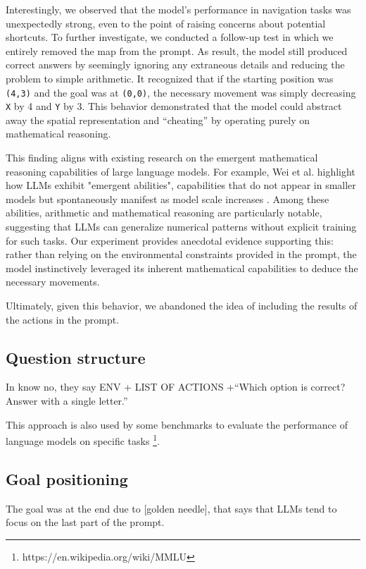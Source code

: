 Interestingly, we observed that the model's performance in navigation tasks was
unexpectedly strong, even to the point of raising concerns about potential shortcuts.
To further investigate, we conducted a follow-up test in which we entirely removed
the map from the prompt. As result, the model still produced correct answers by seemingly
ignoring any extraneous details and reducing the problem to simple arithmetic.
It recognized that if the starting position was \texttt{(4,3)} and the goal was at
\texttt{(0,0)}, the necessary movement was simply decreasing \texttt{X} by 4 and
\texttt{Y} by 3. This behavior demonstrated that the model could abstract away the
spatial representation and ``cheating'' by operating purely on mathematical reasoning.

This finding aligns with existing research on the emergent mathematical reasoning
capabilities of large language models. For example, Wei et al. highlight how
LLMs exhibit "emergent abilities", capabilities that do not appear in smaller models
but spontaneously manifest as model scale increases \cite{wei2022emergentabilitieslargelanguage}.
Among these abilities, arithmetic and mathematical reasoning are particularly notable,
suggesting that LLMs can generalize numerical patterns without explicit training
for such tasks. Our experiment provides anecdotal evidence supporting this:
rather than relying on the environmental constraints provided in the prompt, the
model instinctively leveraged its inherent mathematical capabilities to deduce the
necessary movements.

Ultimately, given this behavior, we abandoned the idea of including the results of
the actions in the prompt.

\subsection{Question structure}

In know no, they say ENV + LIST OF ACTIONS +``Which option is correct? Answer with
a single letter.''

This approach is also used by some benchmarks to evaluate the performance of language
models on specific tasks \footnote{https://en.wikipedia.org/wiki/MMLU}.

\subsection{Goal positioning}

The goal was at the end due to [golden needle], that says that LLMs tend to focus
on the last part of the prompt.

